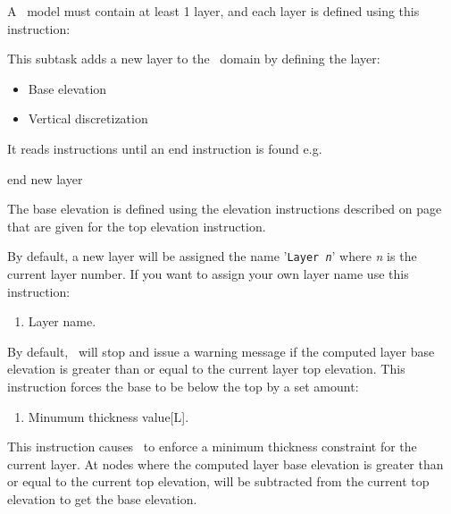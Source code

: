 A \mfus\ model must contain at least 1 layer, and each layer is defined using this instruction:     {

    {This subtask adds a new layer to the \gwf\ domain by defining the layer:
     \begin{itemize}
       \item Base elevation
       \item Vertical discretization
     \end{itemize}

     It reads instructions until an \textsf{end} instruction is found e.g.\:

    {\Large \sf end new layer}
    }

The base elevation is defined using the elevation instructions  described on page~\pageref{'Page:TopElev'} that are given for the \textsf{top elevation} instruction.

By default, a new layer will be assigned the name '\texttt{Layer {\em n}}' where {\em n} is the current layer number.  If you want to assign your own layer name use this instruction:

    {
    \squish
    \begin{enumerate}
    \item {} Layer name.
    \end{enumerate}
    \squish
    }




By default, \mut\ will stop and issue a warning message if the computed layer base elevation is greater than or equal to the current layer top elevation.  This instruction forces the base to be below the top by a set amount:

    {\squish
    \begin{enumerate}
    \item {} Minumum thickness value[L].
    \end{enumerate}
    This instruction causes \mut\ to enforce a minimum thickness constraint for the current layer. At nodes where the computed layer base elevation is greater than or equal to the current top elevation,  will
    be subtracted from the current top elevation to get the base elevation.
    }

}
